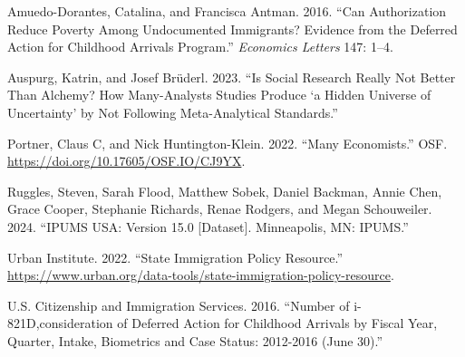 \documentclass[
  letterpaper,
  DIV=11,
  numbers=noendperiod]{scrartcl}
\newlength{\cslhangindent}
\newlength{\cslentryspacingunit} %
\newenvironment{CSLReferences}[2] %
 {%
  \setlength{\parindent}{0pt}
  \ifodd #1
  \let\oldpar\par
  \def\par{\hangindent=\cslhangindent\oldpar}
  \fi
  \setlength{\parskip}{#2\cslentryspacingunit}
 }%
 {}
\begin{document}
\hypertarget{refs}{}
\begin{CSLReferences}{1}{0}
\leavevmode{}%
Amuedo-Dorantes, Catalina, and Francisca Antman. 2016. {``Can
Authorization Reduce Poverty Among Undocumented Immigrants? Evidence
from the Deferred Action for Childhood Arrivals Program.''}
\emph{Economics Letters} 147: 1--4.

\leavevmode{}%
Auspurg, Katrin, and Josef Brüderl. 2023. {``Is Social Research Really
Not Better Than Alchemy? How Many-Analysts Studies Produce {`a Hidden
Universe of Uncertainty'} by Not Following Meta-Analytical Standards.''}

\leavevmode{}%
Portner, Claus C, and Nick Huntington-Klein. 2022. {``Many
Economists.''} OSF. \url{https://doi.org/10.17605/OSF.IO/CJ9YX}.

\leavevmode{}%
Ruggles, Steven, Sarah Flood, Matthew Sobek, Daniel Backman, Annie Chen,
Grace Cooper, Stephanie Richards, Renae Rodgers, and Megan Schouweiler.
2024. {``IPUMS USA: Version 15.0 {[}Dataset{]}. Minneapolis, MN:
IPUMS.''}

\leavevmode{}%
Urban Institute. 2022. {``State Immigration Policy Resource.''}
\url{https://www.urban.org/data-tools/state-immigration-policy-resource}.

\leavevmode{}%
U.S. Citizenship and Immigration Services. 2016. {``Number of
i-821D,consideration of Deferred Action for Childhood Arrivals by Fiscal
Year, Quarter, Intake, Biometrics and Case Status: 2012-2016 (June
30).''}

\end{CSLReferences}
\end{document}

